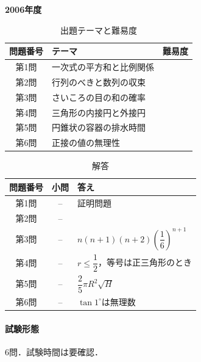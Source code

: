\documentclass[../../main.tex]{subfiles}
\begin{document}
\begin{center}
  {\fontsize{48pt}{58pt}\selectfont \textbf{2006}\normalsize\textbf{年度}}
\end{center}

\begin{table}[htb]
  \centering
  \caption{出題テーマと難易度}
  \begin{tabular}{|c|p{9cm}|c|}
    \hline
    \textbf{問題番号} & \textbf{テーマ} & \textbf{難易度} \\
    \hline
    第1問 & 一次式の平方和と比例関係 & \\
    \hline
    第2問 & 行列のべきと数列の収束 & \\
    \hline
    第3問 & さいころの目の和の確率 & \\
    \hline
    第4問 & 三角形の内接円と外接円 & \\
    \hline
    第5問 & 円錐状の容器の排水時間 & \\
    \hline
    第6問 & 正接の値の無理性 & \\
    \hline
  \end{tabular}
\end{table}

\begin{table}[htb]
  \centering
  \caption{解答}
  \renewcommand{\arraystretch}{1.4}
  \begin{tabular}{|c|c|p{9cm}|}
    \hline
    \textbf{問題番号} & \textbf{小問} & \textbf{答え} \\
    \hline
    第1問 & -- & 証明問題 \\
    \hline
    第2問 & -- &  \\
    \hline
    第3問 & -- & $n(n+1)(n+2)\left(\dfrac{1}{6}\right)^{n+1}$ \\
    \hline
    第4問 & -- & $r\le\dfrac{1}{2}$，等号は正三角形のとき \\
    \hline
    第5問 & -- & $\dfrac{2}{5}\pi R^2\sqrt{H}$ \\
    \hline
    第6問 & -- & $\tan 1^\circ$は無理数 \\
    \hline
  \end{tabular}
\end{table}

\paragraph{試験形態}
6問．試験時間は要確認．
\end{document}
